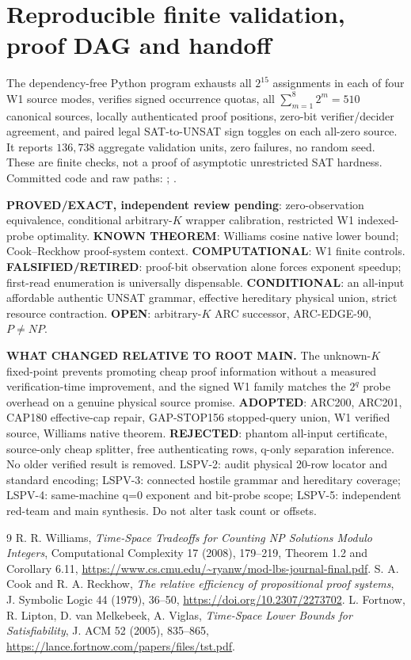\documentclass[11pt]{article}
\begin{document}
\section{Reproducible finite validation, proof DAG and handoff}
The dependency-free Python program exhausts all $2^{15}$ assignments in each of four W1 source modes, verifies signed occurrence quotas, all $\sum_{m=1}^{8}2^m=510$ canonical sources, locally authenticated proof positions, zero-bit verifier/decider agreement, and paired legal SAT-to-UNSAT sign toggles on each all-zero source. It reports $136{,}738$ aggregate validation units, zero failures, no random seed. These are finite checks, not a proof of asymptotic unrestricted SAT hardness. Committed code and raw paths:
;
.

\noindent\textbf{PROVED/EXACT, independent review pending}: zero-observation equivalence, conditional arbitrary-$K$ wrapper calibration, restricted W1 indexed-probe optimality. \textbf{KNOWN THEOREM}: Williams cosine native lower bound; Cook--Reckhow proof-system context. \textbf{COMPUTATIONAL}: W1 finite controls. \textbf{FALSIFIED/RETIRED}: proof-bit observation alone forces exponent speedup; first-read enumeration is universally dispensable. \textbf{CONDITIONAL}: an all-input affordable authentic UNSAT grammar, effective hereditary physical union, strict resource contraction. \textbf{OPEN}: arbitrary-$K$ ARC successor, ARC-EDGE-90, $P\ne NP$.

\noindent\textbf{WHAT CHANGED RELATIVE TO ROOT MAIN.} The unknown-$K$ fixed-point prevents promoting cheap proof information without a measured verification-time improvement, and the signed W1 family matches the $2^q$ probe overhead on a genuine physical source promise. \textbf{ADOPTED}: ARC200, ARC201, CAP180 effective-cap repair, GAP-STOP156 stopped-query union, W1 verified source, Williams native theorem. \textbf{REJECTED}: phantom all-input certificate, source-only cheap splitter, free authenticating rows, q-only separation inference. No older verified result is removed. LSPV-2: audit physical 20-row locator and standard encoding; LSPV-3: connected hostile grammar and hereditary coverage; LSPV-4: same-machine q=0 exponent and bit-probe scope; LSPV-5: independent red-team and main synthesis. Do not alter task count or offsets.

\begin{thebibliography}{9}
 R. R. Williams, \emph{Time-Space Tradeoffs for Counting NP Solutions Modulo Integers}, Computational Complexity 17 (2008), 179--219, Theorem 1.2 and Corollary 6.11, \url{https://www.cs.cmu.edu/~ryanw/mod-lbs-journal-final.pdf}.
 S. A. Cook and R. A. Reckhow, \emph{The relative efficiency of propositional proof systems}, J. Symbolic Logic 44 (1979), 36--50, \url{https://doi.org/10.2307/2273702}.
 L. Fortnow, R. Lipton, D. van Melkebeek, A. Viglas, \emph{Time-Space Lower Bounds for Satisfiability}, J. ACM 52 (2005), 835--865, \url{https://lance.fortnow.com/papers/files/tst.pdf}.
\end{thebibliography}
\end{document}
